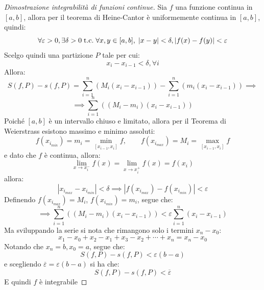 \documentclass[a4paper,12pt,openright]{book}
\begin{document}
	\begin{proof}[Dimostrazione integrabilità di funzioni continue]
		Sia $f$ una funzione continua in $[a, b]$, allora per il teorema di Heine-Cantor è uniformemente continua in $[a, b]$, quindi:
		\[\forall \varepsilon > 0, \exists \delta > 0 \;\text{t.c.}\; \forall x, y \in [a, b], \; |x - y| < \delta, |f(x) - f(y)| < \varepsilon\]
		Scelgo quindi una partizione $P$ tale per cui:
		\[x_i - x_{i - 1} < \delta, \forall i\]
		Allora:
		\[S(f, P) - s(f, P) = \sum_{i=1}^n (M_i(x_i - x_{i - 1})) - \sum_{i=1}^n (m_i(x_i - x_{i - 1})) \implies\]
		\[\implies \sum_{i=1}^n ((M_i - m_i)(x_i - x_{i - 1}))\]
		Poiché $[a, b]$ è un intervallo chiuso e limitato, allora per il Teorema di Weierstrass esistono massimo e minimo assoluti:
		\[f(x_{i_{min}}) = m_i = \min_{[x_{i - 1}, x_i]} f, \quad \quad f(x_{i_{max}}) = M_i = \max_{[x_{i - 1}, x_i]} f\]
		e dato che $f$ è continua, allora:
		\[\lim_{x \rightarrow x_i^-} f(x) = \lim_{x \rightarrow x_i^+} f(x) = f(x_i)\]
		allora:
		\[|x_{i_{max}} - x_{i_{min}}| < \delta \implies |f(x_{i_{max}}) - f(x_{i_{min}})| < \varepsilon\]
		Definendo $f(x_{i_{max}}) = M_i$,  $f(x_{i_{min}}) = m_i$, segue che:
		\[\implies \sum_{i=1}^n ((M_i - m_i)(x_i - x_{i - 1})) < \varepsilon \sum_{i=1}^n (x_i - x_{i - 1})\]
		Ma sviluppando la serie si nota che rimangono solo i termini $x_n - x_0$:
		\[x_1 - x_0 + x_2 - x_1 + x_3 - x_2 + \cdots + x_n = x_n - x_0\]
		Notando che $x_n = b, x_0 = a$, segue che:
		\[S(f, P) - s(f, P) < \varepsilon (b - a)\]
		e scegliendo $\overline{\varepsilon} = \varepsilon(b - a)$ si ha che:
		\[S(f, P) - s(f, P) < \overline{\varepsilon}\]
		E quindi $f$ è integrabile
	\end{proof}
	
\end{document}
